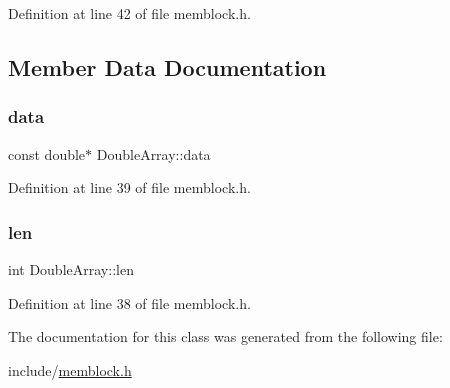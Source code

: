 Definition at line 42 of file memblock.\+h.



\subsection{Member Data Documentation}
\mbox{\label{class_double_array_ab72e768a1b0bed05e975bc9a3e87cc6a}} 
\subsubsection{\texorpdfstring{data}{data}}
{\footnotesize\ttfamily const double$\ast$ Double\+Array\+::data}



Definition at line 39 of file memblock.\+h.

\mbox{\label{class_double_array_abc24e239c776778cbad861e6554d7fac}} 
\subsubsection{\texorpdfstring{len}{len}}
{\footnotesize\ttfamily int Double\+Array\+::len}



Definition at line 38 of file memblock.\+h.



The documentation for this class was generated from the following file\+:\begin{DoxyCompactItemize}
\item 
include/\hyperlink{memblock_8h}{memblock.\+h}\end{DoxyCompactItemize}
